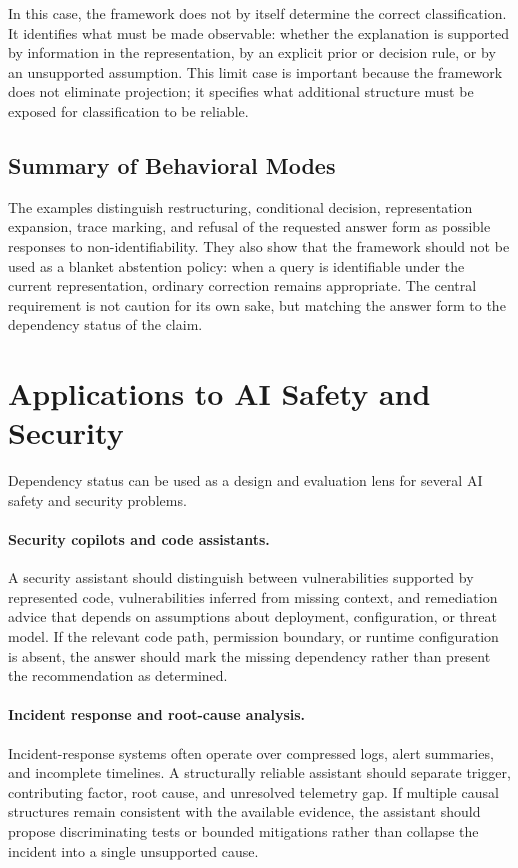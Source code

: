 \documentclass[11pt]{article}
\begin{document}
In this case, the framework does not by itself determine the correct classification. It identifies what must be made observable: whether the explanation is supported by information in the representation, by an explicit prior or decision rule, or by an unsupported assumption. This limit case is important because the framework does not eliminate projection; it specifies what additional structure must be exposed for classification to be reliable.

\subsection{Summary of Behavioral Modes}

The examples distinguish restructuring, conditional decision, representation expansion, trace marking, and refusal of the requested answer form as possible responses to non-identifiability. They also show that the framework should not be used as a blanket abstention policy: when a query is identifiable under the current representation, ordinary correction remains appropriate. The central requirement is not caution for its own sake, but matching the answer form to the dependency status of the claim.

\section{Applications to AI Safety and Security}

Dependency status can be used as a design and evaluation lens for several AI safety and security problems.

\paragraph{Security copilots and code assistants.}
A security assistant should distinguish between vulnerabilities supported by represented code, vulnerabilities inferred from missing context, and remediation advice that depends on assumptions about deployment, configuration, or threat model. If the relevant code path, permission boundary, or runtime configuration is absent, the answer should mark the missing dependency rather than present the recommendation as determined.

\paragraph{Incident response and root-cause analysis.}
Incident-response systems often operate over compressed logs, alert summaries, and incomplete timelines. A structurally reliable assistant should separate trigger, contributing factor, root cause, and unresolved telemetry gap. If multiple causal structures remain consistent with the available evidence, the assistant should propose discriminating tests or bounded mitigations rather than collapse the incident into a single unsupported cause.
\end{document}
